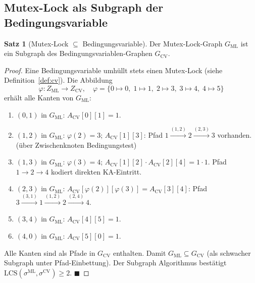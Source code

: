 ﻿\documentclass[a4paper,12pt]{article}
\theoremstyle{definition}
\newtheorem{satz}{Satz}
\begin{document}
\subsection{Mutex-Lock als Subgraph der Bedingungsvariable}

\begin{satz}[Mutex-Lock $\subseteq$ Bedingungsvariable]
  \label{satz:ml_cv}
  Der Mutex-Lock-Graph $G_{\mathrm{ML}}$ ist ein Subgraph des
  Bedingungsvariablen-Graphen $G_{\mathrm{CV}}$.
\end{satz}

\begin{proof}
  Eine Bedingungsvariable umhüllt stets einen Mutex-Lock
  (siehe Definition~\ref{def:cv}). Die Abbildung
  \[
    \varphi: Z_{\mathrm{ML}} \to Z_{\mathrm{CV}},\quad
    \varphi = \{0 \mapsto 0,\; 1 \mapsto 1,\; 2 \mapsto 3,\;
               3 \mapsto 4,\; 4 \mapsto 5\}
  \]
  erhält alle Kanten von $G_{\mathrm{ML}}$:

  \begin{enumerate}
    \item $(0,1)$ in $G_{\mathrm{ML}}$: $A_{\mathrm{CV}}[0][1] = 1$. \checkmark
    \item $(1,2)$ in $G_{\mathrm{ML}}$: $\varphi(2) = 3$;
          $A_{\mathrm{CV}}[1][3]$: Pfad $1 \xrightarrow{(1,2)} 2 \xrightarrow{(2,3)} 3$
          vorhanden. \checkmark (über Zwischenknoten Bedingungstest)
    \item $(1,3)$ in $G_{\mathrm{ML}}$: $\varphi(3)=4$;
          $A_{\mathrm{CV}}[1][2] \cdot A_{\mathrm{CV}}[2][4] = 1 \cdot 1$.
          Pfad $1 \to 2 \to 4$ kodiert direkten KA-Eintritt. \checkmark
    \item $(2,3)$ in $G_{\mathrm{ML}}$: $A_{\mathrm{CV}}[\varphi(2)][\varphi(3)]
          = A_{\mathrm{CV}}[3][4]$: Pfad $3 \xrightarrow{(3,1)} 1
          \xrightarrow{(1,2)} 2 \xrightarrow{(2,4)} 4$. \checkmark
    \item $(3,4)$ in $G_{\mathrm{ML}}$: $A_{\mathrm{CV}}[4][5] = 1$. \checkmark
    \item $(4,0)$ in $G_{\mathrm{ML}}$: $A_{\mathrm{CV}}[5][0] = 1$. \checkmark
  \end{enumerate}

  Alle Kanten sind als Pfade in $G_{\mathrm{CV}}$ enthalten.
  Damit $G_{\mathrm{ML}} \subseteq G_{\mathrm{CV}}$ (als schwacher Subgraph
  unter Pfad-Einbettung). Der Subgraph Algorithmus bestätigt
  $\mathrm{LCS}(\sigma^{\mathrm{ML}}, \sigma^{\mathrm{CV}}) \geq 2$.
  \hfill$\blacksquare$
\end{proof}
\end{document}

